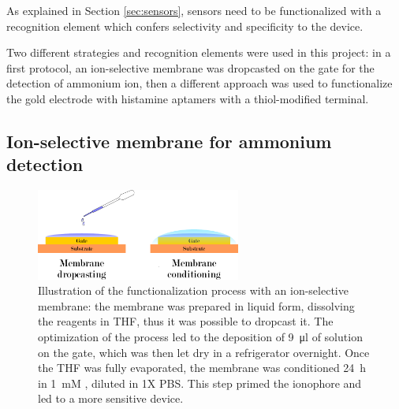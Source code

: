 As explained in Section \ref{sec:sensors}, sensors need to be functionalized with a recognition element which confers selectivity and specificity to the device. 

Two different strategies and recognition elements were used in this project: in a first protocol, an ion-selective membrane was dropcasted on the gate for the detection of ammonium ion, then a different approach was used to functionalize the gold electrode with histamine aptamers with a thiol-modified terminal. 

\subsection{Ion-selective membrane for ammonium detection}
\label{sec:amm_membrane}

\begin{figure}[ht]
    \centering
    \includegraphics[width=0.6\textwidth]{figures/chapter2/functionalization/Fig11_functionalizationMembrane.pdf}
    \caption{Illustration of the functionalization process with an ion-selective membrane: the membrane was prepared in liquid form, dissolving the reagents in THF, thus it was possible to dropcast it. The optimization of the process led to the deposition of \SI{9}{\micro\l} of solution on the gate, which was then let dry in a refrigerator overnight. Once the THF was fully evaporated, the membrane was conditioned \SI{24}{\hour} in \SI{1}{mM} \amm{}, diluted in 1X PBS. This step primed the ionophore and led to a more sensitive device.}
    \label{fig:functionalizationMembrane}
\end{figure}

